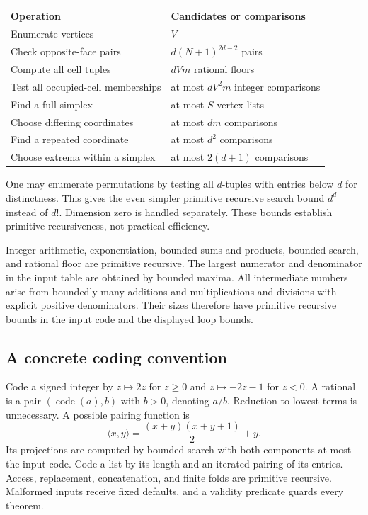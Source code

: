 \documentclass[11pt,a4paper]{article}
\theoremstyle{definition}
\begin{document}
\begin{center}
\begin{tabular}{p{}p{}}
\toprule
Operation & Candidates or comparisons\\
\midrule
Enumerate vertices & $V$\\
Check opposite-face pairs & $d(N+1)^{2d-2}$ pairs\\
Compute all cell tuples & $dVm$ rational floors\\
Test all occupied-cell memberships & at most $dV^2m$ integer comparisons\\
Find a full simplex & at most $S$ vertex lists\\
Choose differing coordinates & at most $dm$ comparisons\\
Find a repeated coordinate & at most $d^2$ comparisons\\
Choose extrema within a simplex & at most $2(d+1)$ comparisons\\
\bottomrule
\end{tabular}
\end{center}

One may enumerate permutations by testing all $d$-tuples with
entries below $d$ for distinctness. This gives the even simpler
primitive recursive search bound $d^d$ instead of $d!$.
Dimension zero is handled separately. These bounds establish
primitive recursiveness, not practical efficiency.

Integer arithmetic, exponentiation, bounded sums and products,
bounded search, and rational floor are primitive recursive.
The largest numerator and denominator in the input table are
obtained by bounded maxima. All intermediate numbers arise
from boundedly many additions and multiplications and
divisions with explicit positive denominators. Their sizes
therefore have primitive recursive bounds in the input code
and the displayed loop bounds.

\subsection{A concrete coding convention}
Code a signed integer by $z\mapsto2z$ for $z\geq0$ and
$z\mapsto-2z-1$ for $z<0$. A rational is a pair
$(\operatorname{code}(a),b)$ with $b>0$, denoting $a/b$.
Reduction to lowest terms is unnecessary.
A possible pairing function is
\[
        \langle x,y\rangle=\frac{(x+y)(x+y+1)}2+y.
\]
Its projections are computed by bounded search with both
components at most the input code. Code a list by its length
and an iterated pairing of its entries. Access, replacement,
concatenation, and finite folds are primitive recursive.
Malformed inputs receive fixed defaults, and a validity
predicate guards every theorem.
\end{document}
